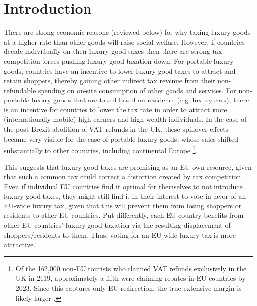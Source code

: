 \documentclass[../../main]{subfiles}
\begin{document}
\section{Introduction}

There are strong economic reasons (reviewed %
below) for why taxing luxury goods at a higher rate than other goods will raise social welfare. However, if countries decide individually on their luxury good taxes then there are strong tax competition forces pushing luxury good taxation down. For portable luxury goods, countries have an incentive to lower luxury good taxes to attract and retain shoppers, thereby gaining other indirect tax revenue from their non-refundable spending on on-site consumption of other goods and services.  For non-portable luxury goods that are taxed based on residence (e.g. luxury cars), there is an incentive for countries to lower the tax rate in order to attract more (internationally mobile) high earners and high wealth individuals. In the case of the post-Brexit abolition of VAT refunds in the UK, these spillover effects became very visible for the case of portable  luxury goods, whose sales shifted substantially to other countries, including continental Europe \footnote{Of the 162{,}000 non-EU tourists who claimed VAT refunds exclusively in the UK in 2019, approximately a fifth were claiming rebates in EU countries by 2023.  Since this captures only EU-redirection, the true extensive margin is likely larger \cite{Bloomberg2024}.}. 


This suggests that luxury good taxes are promising as an EU own resource, given that such a common tax could correct a distortion created by tax competition. Even if individual EU countries find it optimal for themselves to not introduce luxury good taxes, they might still find it in their interest to vote in favor of an EU-wide luxury tax, given that this will prevent them from losing shoppers or residents to other EU countries. Put differently, each EU country benefits from other EU countries' luxury good taxation via the resulting displacement of  %
shoppers/residents to them. Thus, voting for an EU-wide luxury tax is more attractive.
\end{document}
